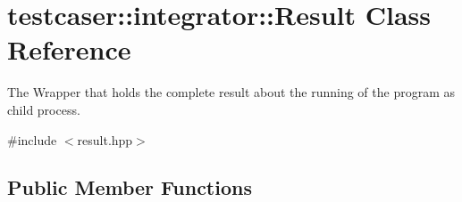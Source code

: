 \hypertarget{classtestcaser_1_1integrator_1_1Result}{}\section{testcaser\+::integrator\+::Result Class Reference}
\label{classtestcaser_1_1integrator_1_1Result}


The Wrapper that holds the complete result about the running of the program as child process.  




{\ttfamily \#include $<$result.\+hpp$>$}

\subsection*{Public Member Functions}
